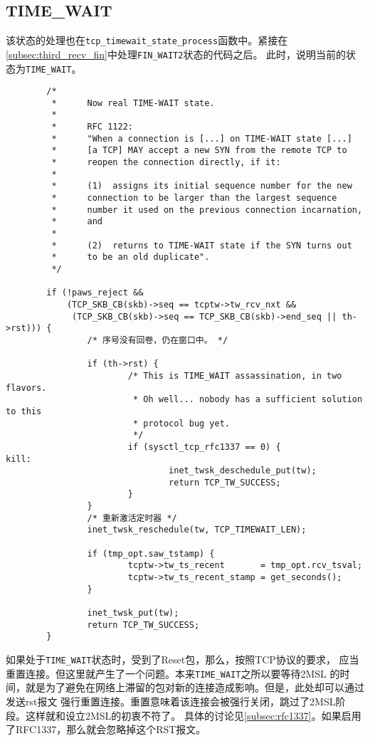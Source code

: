 \subsection{TIME\_WAIT}
\label{subsec:time_wait}
该状态的处理也在\texttt{tcp_timewait_state_process}函数中。紧接在
\ref{subsec:third_recv_fin}中处理\texttt{FIN_WAIT2}状态的代码之后。
此时，说明当前的状态为\texttt{TIME_WAIT}。
\begin{verbatim}
        /*
         *      Now real TIME-WAIT state.
         *
         *      RFC 1122:
         *      "When a connection is [...] on TIME-WAIT state [...]
         *      [a TCP] MAY accept a new SYN from the remote TCP to
         *      reopen the connection directly, if it:
         *
         *      (1)  assigns its initial sequence number for the new
         *      connection to be larger than the largest sequence
         *      number it used on the previous connection incarnation,
         *      and
         *
         *      (2)  returns to TIME-WAIT state if the SYN turns out
         *      to be an old duplicate".
         */

        if (!paws_reject &&
            (TCP_SKB_CB(skb)->seq == tcptw->tw_rcv_nxt &&
             (TCP_SKB_CB(skb)->seq == TCP_SKB_CB(skb)->end_seq || th->rst))) {
                /* 序号没有回卷，仍在窗口中。 */

                if (th->rst) {
                        /* This is TIME_WAIT assassination, in two flavors.
                         * Oh well... nobody has a sufficient solution to this
                         * protocol bug yet.
                         */
                        if (sysctl_tcp_rfc1337 == 0) {
kill:
                                inet_twsk_deschedule_put(tw);
                                return TCP_TW_SUCCESS;
                        }
                }
                /* 重新激活定时器 */
                inet_twsk_reschedule(tw, TCP_TIMEWAIT_LEN);

                if (tmp_opt.saw_tstamp) {
                        tcptw->tw_ts_recent       = tmp_opt.rcv_tsval;
                        tcptw->tw_ts_recent_stamp = get_seconds();
                }

                inet_twsk_put(tw);
                return TCP_TW_SUCCESS;
        }
\end{verbatim}
如果处于\texttt{TIME_WAIT}状态时，受到了Reset包，那么，按照TCP协议的要求，
应当重置连接。但这里就产生了一个问题。本来\texttt{TIME_WAIT}之所以要等待2MSL
的时间，就是为了避免在网络上滞留的包对新的连接造成影响。但是，此处却可以通过发送rst报文
强行重置连接。重置意味着该连接会被强行关闭，跳过了2MSL阶段。这样就和设立2MSL的初衷不符了。
具体的讨论见\ref{subsec:rfc1337}。如果启用了RFC1337，那么就会忽略掉这个RST报文。

